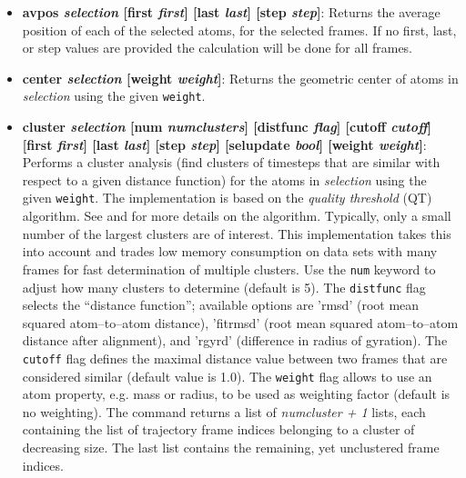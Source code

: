 \begin{itemize}
\item {\bf avpos {\it selection} [first {\it first}] [last {\it last}] [step {\it step}]}: 
  Returns the average position of each of the selected atoms, for the 
  selected frames.  If no first, last, or step values are 
  provided the calculation will be done for all frames.

\item {\bf center {\it selection} [weight {\it weight}]}:
  Returns the geometric center of atoms in {\it selection} using the
  given {\tt weight}.

\item {\bf cluster {\it selection} [num {\it numclusters}] [distfunc {\it flag}] 
    [cutoff {\it cutoff}] [first {\it first}] [last {\it last}] [step {\it step}]
    [selupdate {\it bool}] [weight {\it weight}]}:
  Performs a cluster analysis (find clusters of timesteps that are 
  similar with respect to a given distance function) for the atoms
  in {\it selection} using the given {\tt weight}. 
  The implementation is based on the {\it quality threshold} (QT) algorithm. 
  See  
  and  for more details
  on the algorithm. Typically, only a small number of the largest clusters are
  of interest. This implementation takes this into account and trades low 
  memory consumption on data sets with many frames for fast determination 
  of multiple clusters.  Use the {\tt num} keyword to adjust how many clusters
  to determine (default is 5). The {\tt distfunc} flag selects the 
  ``distance function''; available options are 'rmsd' (root mean 
  squared atom--to--atom distance), 'fitrmsd' (root mean squared 
  atom--to--atom distance after alignment), and 'rgyrd' (difference 
  in radius of gyration). The {\tt cutoff} flag defines the maximal 
  distance value  between two frames that are considered similar 
  (default value is 1.0). The {\tt weight} flag allows to use an
  atom property, e.g. mass or radius, to be used as weighting factor
  (default is no weighting). The command returns a list of {\it numcluster + 1}
  lists, each containing the list of trajectory frame indices belonging to a 
  cluster of decreasing size. The last list contains the remaining, yet
  unclustered frame indices.


\end{itemize}
